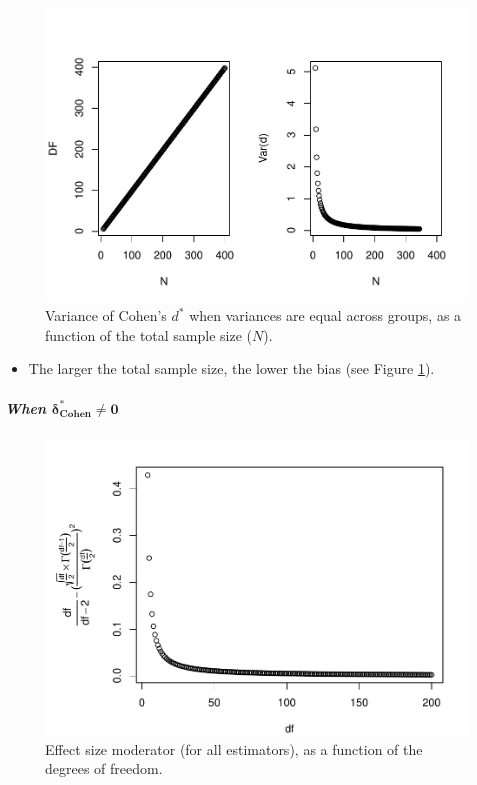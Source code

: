 \documentclass[
  english,
  man,mask]{apa6}
\providecommand{\tightlist}{%
  \setlength{\itemsep}{0pt}\setlength{\parskip}{0pt}}
\let\oldsubparagraph\subparagraph
\renewcommand{\subparagraph}[1]{\oldsubparagraph{#1}\mbox{}}
\begin{document}
\begin{figure}
\centering
\includegraphics{Theoretical-Bias-of-all-estimators-as-a-function-of-population-parameters_files/figure-latex/varcohendprimehomNsize2-1.pdf}
\caption{\label{fig:varcohendprimehomNsize2}Variance of Cohen's \(d^*\) when variances are equal across groups, as a function of the total sample size (\(N\)).}
\end{figure}

\begin{itemize}
\tightlist
\item
  The larger the total sample size, the lower the bias (see Figure \ref{fig:varcohendprimehomNsize2}).
\end{itemize}

\hypertarget{when-bmdelta_cohen-neq-0}{%
\subparagraph{\texorpdfstring{When \(\bm{\delta^*_{Cohen} \neq 0}\)}{When \textbackslash bm\{\textbackslash delta\^{}*\_\{Cohen\} \textbackslash neq 0\}}}\label{when-bmdelta_cohen-neq-0}}

\begin{figure}
\centering
\includegraphics{Theoretical-Bias-of-all-estimators-as-a-function-of-population-parameters_files/figure-latex/ESmoderator2-1.pdf}
\caption{\label{fig:ESmoderator2}Effect size moderator (for all estimators), as a function of the degrees of freedom.}
\end{figure}
\end{document}
